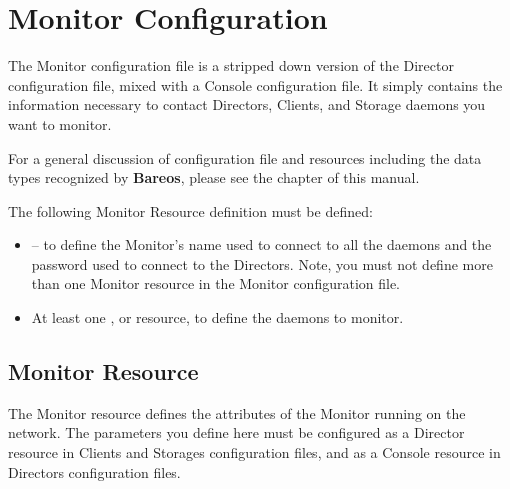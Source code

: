 
\chapter{Monitor Configuration}
\label{_MonitorChapter}

The Monitor configuration file is a stripped down version of the Director
configuration file, mixed with a Console configuration file. It simply
contains the information necessary to contact Directors, Clients, and Storage
daemons you want to monitor.

For a general discussion of configuration file and resources including the
data types recognized by {\bf Bareos}, please see the
 chapter of this manual.

The following Monitor Resource definition must be defined:

\begin{itemize}
\item
{} -- to  define the Monitor's
name used to connect to all the daemons and  the password used to connect to
the Directors. Note, you must not  define more than one Monitor resource in
the  Monitor configuration file.

\item At least one
,
 or
 resource, to define the daemons to monitor.
\end{itemize}

\section{Monitor Resource}
\label{MonitorResource}

The Monitor resource defines the attributes of the Monitor running on the
network. The parameters you define here must be configured as a Director
resource in Clients and Storages configuration files, and as a Console
resource in Directors configuration files.

